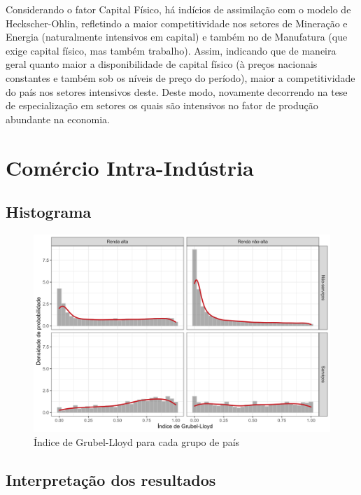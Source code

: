 Considerando o fator Capital Físico, há indícios de assimilação com o modelo de Heckscher-Ohlin, refletindo a maior competitividade nos setores de Mineração e Energia (naturalmente intensivos em capital) e também no de Manufatura (que exige capital físico, mas também trabalho). Assim, indicando que de maneira geral quanto maior a disponibilidade de capital físico (à preços nacionais constantes e também sob os níveis de preço do período), maior a competitividade do país nos setores intensivos deste. Deste modo, novamente decorrendo na tese de especialização em setores os quais são intensivos no fator de produção abundante na economia.

\clearpage
\section{Comércio Intra-Indústria}
\setcounter{subsection}{5}

\subsection{Histograma}

\begin{figure}[!h]
    \centering
    \caption{Índice de Grubel-Lloyd para cada grupo de país}
    \includegraphics*[width = 0.8\linewidth]{../plots/gl.png}

\end{figure}

\subsection{Interpretação dos resultados}


\clearpage
